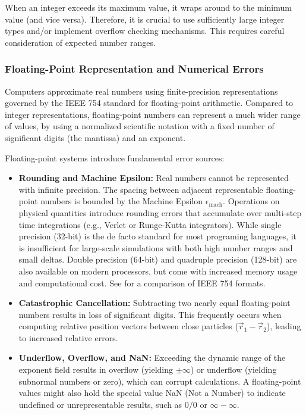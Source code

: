 When an integer exceeds its maximum value, it wraps around to the minimum value (and vice versa).
Therefore, it is crucial to use sufficiently large integer types and/or implement overflow checking mechanisms.
This requires careful consideration of expected number ranges.

\subsubsection{Floating-Point Representation and Numerical Errors}

Computers approximate real numbers using finite-precision representations 
governed by the IEEE 754 standard for floating-point arithmetic\cite{IEEE754_2019}.
Compared to integer representations, floating-point numbers can represent a much wider range of values,
by using a normalized scientific notation with a fixed number of significant digits (the mantissa) and an exponent.

Floating-point systems introduce fundamental error sources\cite{Goldberg1991FloatingPoint}:
\begin{itemize}
\item \textbf{Rounding and Machine Epsilon:} 
    Real numbers cannot be represented with infinite precision. 
    The spacing between adjacent representable floating-point numbers is bounded by the Machine Epsilon $\epsilon_{\text{mach}}$.
    Operations on physical quantities introduce rounding errors that accumulate over multi-step time integrations 
    (e.g., Verlet or Runge-Kutta integrators).
    While single precision (32-bit) is the de facto standard for most programing languages, 
    it is insufficient for large-scale simulations with both high number ranges and small deltas.
    Double precision (64-bit) and quadruple precision (128-bit) are also available on modern processors, 
    but come with increased memory usage and computational cost. 
    See  for a comparison of IEEE 754 formats.
\item \textbf{Catastrophic Cancellation:}
    Subtracting two nearly equal floating-point numbers results in loss of significant digits. 
    This frequently occurs when computing relative position vectors between close particles 
    ($\vec{r}_1 - \vec{r}_2$), leading to increased relative errors.
\item \textbf{Underflow, Overflow, and NaN:}
    Exceeding the dynamic range of the exponent field results in overflow (yielding $\pm\infty$) 
    or underflow (yielding subnormal numbers or zero), which can corrupt calculations.
    A floating-point values might also hold the special value NaN (Not a Number) to indicate undefined or unrepresentable results,
    such as $0/0$ or $\infty - \infty$.
\end{itemize}


